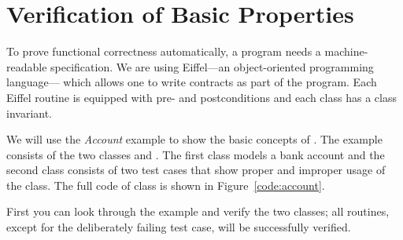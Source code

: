 \section{Verification of Basic Properties}

To prove functional correctness automatically, a program needs a machine-readable specification. We are using Eiffel---an object-oriented programming language--- which allows one to write contracts as part of the program. Each Eiffel routine is equipped with pre- and postconditions and each class has a class invariant.

We will use the \emph{Account} example to show the basic concepts of \AutoProof. The example consists of the two classes  and . The first class models a bank account and the second class consists of two test cases that show proper and improper usage of the class. The full code of class  is shown in Figure~\ref{code:account}. 

First you can look through the example and verify the two classes; all routines, except for the deliberately failing test case, will be successfully verified.

